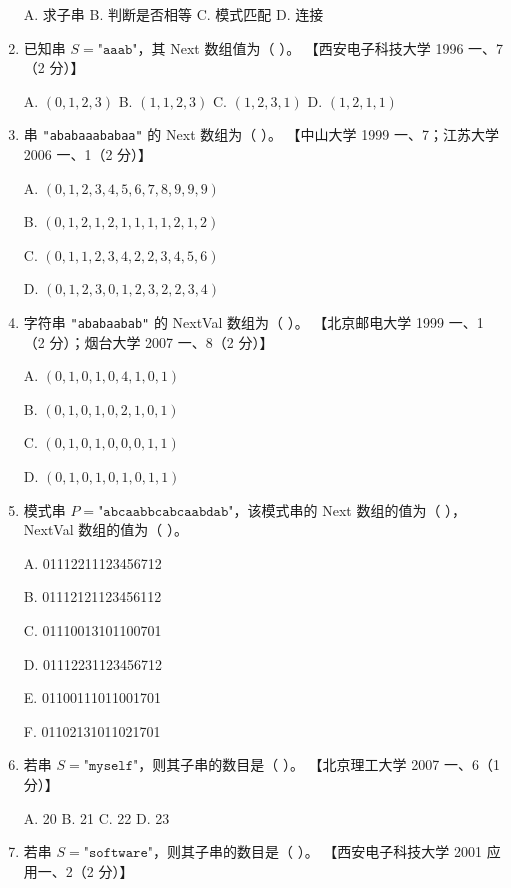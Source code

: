 \documentclass[lang=cn,newtx,10pt,scheme=chinese]{../../elegantbook}
\begin{document}
\begin{enumerate}
    A. 求子串 \quad B. 判断是否相等 \quad C. 模式匹配 \quad D. 连接  

    \item 已知串 $S = \texttt{"aaab"}$，其 Next 数组值为（ ）。  
    【西安电子科技大学 1996 一、7（2 分）】 

    A. $(0, 1, 2, 3)$ \quad B. $(1, 1, 2, 3)$ \quad C. $(1, 2, 3, 1)$ \quad D. $(1, 2, 1, 1)$  

    \item 串 \texttt{"ababaaababaa"} 的 Next 数组为（ ）。  
    【中山大学 1999 一、7；江苏大学 2006 一、1（2 分）】  

    A. $(0, 1, 2, 3, 4, 5, 6, 7, 8,9,9,9)$  

    B. $(0, 1, 2, 1, 2, 1, 1, 1, 1,2,1,2)$  

    C. $(0, 1, 1, 2, 3, 4, 2, 2, 3,4,5,6)$  

    D. $(0, 1, 2, 3, 0, 1, 2, 3, 2,2,3,4)$  

    \item 字符串 \texttt{"ababaabab"} 的 NextVal 数组为（ ）。  
    【北京邮电大学 1999 一、1（2 分）；烟台大学 2007 一、8（2 分）】  

    A. $(0, 1, 0, 1, 0, 4, 1, 0, 1)$  

    B. $(0, 1, 0, 1, 0, 2, 1, 0, 1)$  

    C. $(0, 1, 0, 1, 0, 0, 0, 1, 1)$  

    D. $(0, 1, 0, 1, 0, 1, 0, 1, 1)$  

    \item 模式串 $P = \texttt{"abcaabbcabcaabdab"}$，该模式串的 Next 数组的值为（ ），NextVal 数组的值为（ ）。  
    
    A. 01112211123456712 

    B. 01112121123456112 

    C. 01110013101100701 

    D. 01112231123456712 

    E. 01100111011001701 

    F. 01102131011021701  

       \item 若串 $S = \texttt{"myself"}$，则其子串的数目是（ ）。  
       【北京理工大学 2007 一、6（1 分）】  

       A. 20 \quad B. 21 \quad C. 22 \quad D. 23  
   
       \item 若串 $S = \texttt{"software"}$，则其子串的数目是（ ）。  
       【西安电子科技大学 2001 应用一、2（2 分）】  


\end{enumerate}
\end{document}
